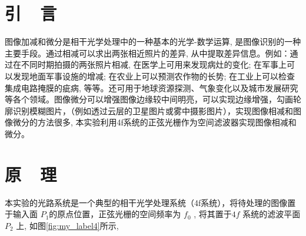 \documentclass{buaaemp}
\begin{document}



\wuhao 

\section{引~~言}
图像加减和微分是相干光学处理中的一种基本的光学-数学运算, 是图像识别的一种主要手段。通过相减可以求出两张相近照片的差异, 从中提取差异信息。例如：通过在不同时期拍摄的两张照片相减, 在医学上可用来发现病灶的变化; 在军事上可以发现地面军事设施的增减; 在农业上可以预测农作物的长势; 在工业上可以检查集成电路掩膜的疵病, 等等。还可用于地球资源探测、气象变化以及城市发展研究等各个领域。图像微分可以增强图像边缘较中间明亮，可以实现边缘增强，勾画轮廓识别模糊图片，（例如透过云层的卫星图片或雾中摄影图片），实现图像相减和图像微分的方法很多, 本实验利用4f系统的正弦光栅作为空间滤波器实现图像相减和微分。\cite{钱建强2016近代物理实验}

\section{原~~理}
本实验的光路系统是一个典型的相干光学处理系统（4f系统），将待处理的图像置于输入面 $P_1$的原点位置，正弦光栅的空间频率为  $f_{0}$ , 将其置于$  4 f $ 系统的滤波平面  $P_{2}$  上, 如图\ref{fig:my_label4}所示, 
\end{document}

